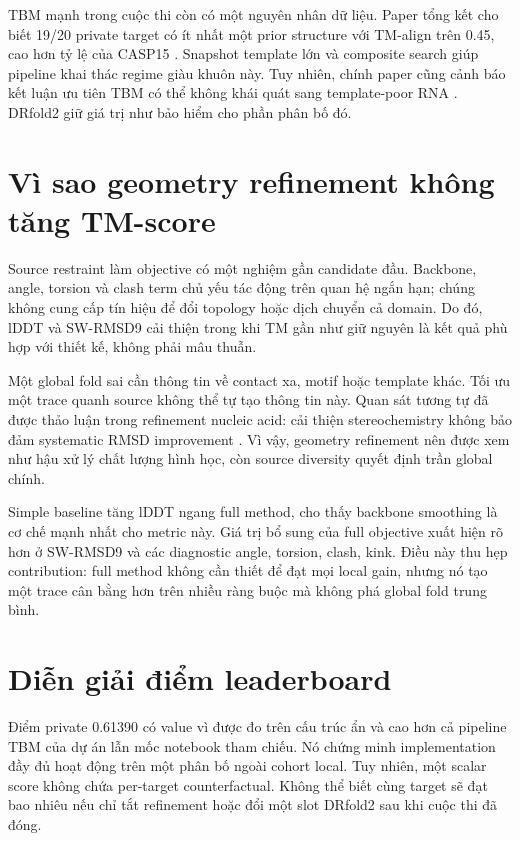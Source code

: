 \documentclass[12pt,a4paper,oneside]{report}
\begin{document}
TBM mạnh trong cuộc thi còn có một nguyên nhân dữ liệu. Paper tổng kết cho biết 19/20
private target có ít nhất một prior structure với TM-align trên 0.45, cao hơn tỷ lệ của
CASP15 \cite{competition_paper}. Snapshot template lớn và composite search giúp pipeline
khai thác regime giàu khuôn này. Tuy nhiên, chính paper cũng cảnh báo kết luận ưu tiên TBM
có thể không khái quát sang template-poor RNA \cite{competition_paper}. DRfold2 giữ giá
trị như bảo hiểm cho phần phân bố đó.

\section{Vì sao geometry refinement không tăng TM-score}

Source restraint làm objective có một nghiệm gần candidate đầu. Backbone, angle, torsion
và clash term chủ yếu tác động trên quan hệ ngắn hạn; chúng không cung cấp tín hiệu để
đổi topology hoặc dịch chuyển cả domain. Do đó, lDDT và SW-RMSD9 cải thiện trong khi TM
gần như giữ nguyên là kết quả phù hợp với thiết kế, không phải mâu thuẫn.

Một global fold sai cần thông tin về contact xa, motif hoặc template khác. Tối ưu một
trace quanh source không thể tự tạo thông tin này. Quan sát tương tự đã được thảo luận
trong refinement nucleic acid: cải thiện stereochemistry không bảo đảm systematic RMSD
improvement \cite{qrnas}. Vì vậy, geometry refinement nên được xem như hậu xử lý chất
lượng hình học, còn source diversity quyết định trần global chính.

Simple baseline tăng lDDT ngang full method, cho thấy backbone smoothing là cơ chế mạnh
nhất cho metric này. Giá trị bổ sung của full objective xuất hiện rõ hơn ở SW-RMSD9 và
các diagnostic angle, torsion, clash, kink. Điều này thu hẹp contribution: full method
không cần thiết để đạt mọi local gain, nhưng nó tạo một trace cân bằng hơn trên nhiều
ràng buộc mà không phá global fold trung bình.

\section{Diễn giải điểm leaderboard}

Điểm private 0.61390 có value vì được đo trên cấu trúc ẩn và cao hơn cả pipeline TBM của
dự án lẫn mốc notebook tham chiếu. Nó chứng minh implementation đầy đủ hoạt động trên
một phân bố ngoài cohort local. Tuy nhiên, một scalar score không chứa per-target
counterfactual. Không thể biết cùng target sẽ đạt bao nhiêu nếu chỉ tắt refinement hoặc
đổi một slot DRfold2 sau khi cuộc thi đã đóng.
\end{document}
